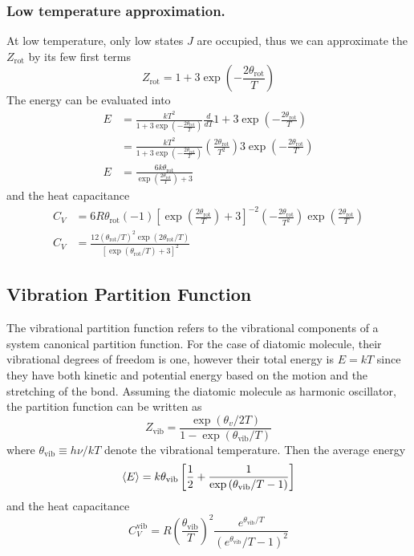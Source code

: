 \documentclass[../../../Main.tex]{subfiles}
\begin{document}
\subsubsection*{Low temperature approximation.} At low temperature, only low states $J$ are occupied, thus we can approximate the $Z_\text{rot}$ by its few first terms
\begin{equation*}
	Z_\text{rot}=1+3\exp\left(-\frac{2\theta_\text{rot}}{T}\right)
\end{equation*}
The energy can be evaluated into
\begin{align*}
	E & =\frac{kT^2}{1+3\exp\left(-\frac{2\theta_\text{rot}}{T}\right)}\frac{d}{dT}1+3\exp\left(-\frac{2\theta_\text{rot}}{T}\right)                              \\
	  & =\frac{kT^2}{1+3\exp\left(-\frac{2\theta_\text{rot}}{T}\right)}\left(\frac{2\theta_\text{rot}}{T^2}\right)3\exp\left(-\frac{2\theta_\text{rot}}{T}\right) \\
	E & =\frac{6k\theta_\text{rot}}{\exp\left(\frac{2\theta_\text{rot}}{T}\right)+3}
\end{align*}
and the heat capacitance
\begin{align*}
	C_V & =6R\theta_\text{rot}(-1)\left[\exp\left(\frac{2\theta_\text{rot}}{T}\right)+3\right]^{-2}\left(-\frac{2\theta_\text{rot}}{T^2}\right)\exp\left(\frac{2\theta_\text{rot}}{T}\right) \\
	C_V & =\frac{12(\theta_\text{rot}/T)^2\exp(2\theta_\text{rot}/T)}{\left[\exp(\theta_\text{rot}/T)+3\right]^2}
\end{align*}

\subsection*{Vibration Partition Function}
The vibrational partition function refers to the vibrational components of a system canonical partition function.
For the case of diatomic molecule, their vibrational degrees of freedom is one, however their total energy is $E=kT$ since they have both kinetic and potential energy based on the motion and the stretching of the bond.
Assuming the diatomic molecule as harmonic oscillator, the partition function can be written as
\begin{equation*}
	Z_\text{vib}=\frac{\exp\left({\theta_v}/{2T}\right)}{1-\exp\left({\theta_\text{vib}}/{T}\right)}
\end{equation*}
where $\theta_\text{vib}\equiv h\nu/kT$ denote the vibrational temperature. Then the average energy
\begin{equation*}
	\braket{E}=k\theta_\text{vib}\left[\frac{1}{2}+\frac{1}{\exp\left(\theta_\text{vib}/T-1\right)}\right]
\end{equation*}
and the heat capacitance
\begin{equation*}
	C_V^{\text{vib}}=R\left(\frac{\theta_\text{vib}}{T}\right)^2\frac{e^{\theta_\text{vib}/T}}{(e^{\theta_\text{vib}}/T-1)^2}
\end{equation*}
\end{document}
